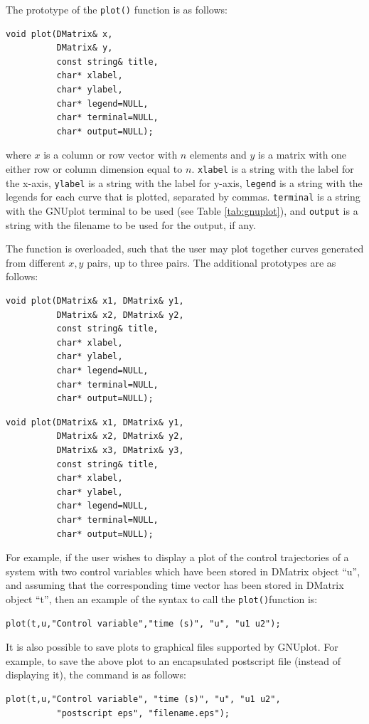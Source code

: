 \documentclass[a4paper,11pt]{report}    %
\newenvironment{shadedframe}{%
  \def\FrameCommand{\fcolorbox{black}{shadecolor}}%
  \MakeFramed {\FrameRestore}}
{\endMakeFramed}
\begin{document}
The prototype of the \texttt{plot()} function is as follows:

\begin{verbatim}
void plot(DMatrix& x, 
          DMatrix& y,
          const string& title, 
          char* xlabel, 
          char* ylabel, 
          char* legend=NULL, 
          char* terminal=NULL, 
          char* output=NULL);
\end{verbatim}

\noindent where $x$ is a column or row vector with $n$ elements and $y$ is a matrix with 
one either row or column dimension equal to $n$. 
\verb|xlabel| is a string with the  label for the x-axis, \verb|ylabel| is a string with the label
for y-axis, \verb|legend| is a string with the legends for each curve that is plotted, separated
by commas. \verb|terminal| is a string with the GNUplot terminal to be used (see Table \ref{tab:gnuplot}), and
\verb|output| is a string with the filename to be used for the output, if any.

The function is overloaded,
such that the user may  plot together curves generated from 
different $x, y$  pairs, up to three pairs. The additional prototypes are
as follows:

\begin{verbatim}
void plot(DMatrix& x1, DMatrix& y1,
          DMatrix& x2, DMatrix& y2,
          const string& title, 
          char* xlabel, 
          char* ylabel, 
          char* legend=NULL, 
          char* terminal=NULL, 
          char* output=NULL);
\end{verbatim}

\begin{verbatim}
void plot(DMatrix& x1, DMatrix& y1,
          DMatrix& x2, DMatrix& y2,
          DMatrix& x3, DMatrix& y3,
          const string& title, 
          char* xlabel, 
          char* ylabel, 
          char* legend=NULL, 
          char* terminal=NULL, 
          char* output=NULL);
\end{verbatim}


\begin{shadedframe}

For example, if the user wishes to display a plot of the control trajectories of a system
with two control variables which have been stored in
DMatrix object ``u'', and assuming that the corresponding time vector has been stored in DMatrix object ``t'', 
then an example of the syntax to call the \texttt{plot()}function is:

\begin{verbatim}
plot(t,u,"Control variable","time (s)", "u", "u1 u2");
\end{verbatim}

It is also possible to save plots to graphical files supported by GNUplot. For example,
to save the above plot to an encapsulated postscript file (instead of displaying it), 
the command is as follows:

\begin{verbatim}
plot(t,u,"Control variable", "time (s)", "u", "u1 u2", 
          "postscript eps", "filename.eps");
\end{verbatim}

\end{shadedframe}
\end{document}
